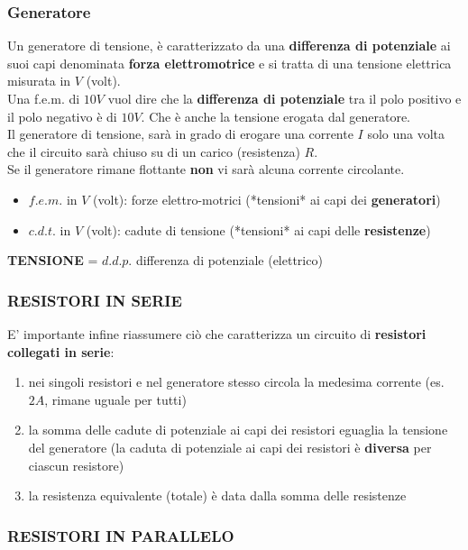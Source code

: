 \documentclass{article}
\begin{document}
\subsubsection{Generatore}

Un generatore di tensione, è caratterizzato da una \textbf{differenza di potenziale} ai suoi capi denominata \textbf{forza elettromotrice} e si tratta di una tensione elettrica misurata in $V$ (volt).\\
Una f.e.m. di $10V$ vuol dire che la \textbf{differenza di potenziale} tra il polo positivo e il polo negativo è di $10V$. Che è anche la tensione erogata dal generatore.\\
Il generatore di tensione, sarà in grado di erogare una corrente $I$ solo una volta che il circuito sarà chiuso su di un carico (resistenza) $R$. \\
Se il generatore rimane flottante \textbf{non} vi sarà alcuna corrente circolante.
\begin{itemize}
  \item $f.e.m.$ in $V$ (volt): forze elettro-motrici (*tensioni* ai capi dei \textbf{generatori})
  \item $c.d.t.$ in $V$ (volt): cadute di tensione (*tensioni* ai capi delle \textbf{resistenze})
\end{itemize}


\textbf{TENSIONE} = $d.d.p.$ differenza di potenziale (elettrico)

\subsubsection{RESISTORI IN SERIE}
E' importante infine riassumere ciò che caratterizza un circuito di \textbf{resistori collegati in serie}:    
\begin{enumerate}
  \item nei singoli resistori e nel generatore stesso circola la medesima corrente (es. $2A$, rimane uguale per tutti)
  \item la somma delle cadute di potenziale ai capi dei resistori eguaglia la tensione del generatore (la caduta di potenziale ai capi dei resistori è \textbf{diversa} per ciascun resistore)
  \item la resistenza equivalente (totale) è data dalla somma delle resistenze
\end{enumerate}

\subsubsection{RESISTORI IN PARALLELO}
\end{document}
